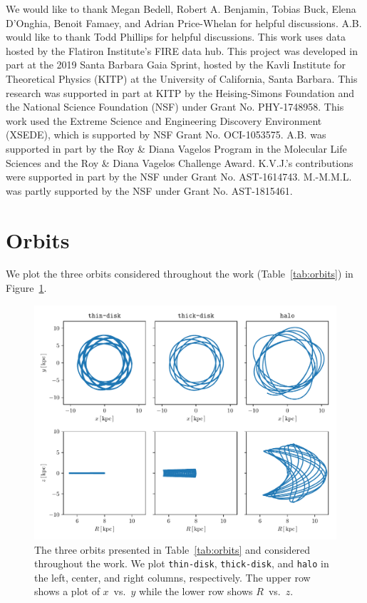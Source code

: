 \documentclass[twocolumn]{aastex62}
\newcommand{\thin}{\texttt{thin-disk}}
\newcommand{\thick}{\texttt{thick-disk}}
\newcommand{\halo}{\texttt{halo}}
\begin{document}
\acknowledgments
We would like to thank Megan Bedell, Robert A. Benjamin, Tobias Buck, Elena
D'Onghia, Benoit Famaey, and Adrian Price-Whelan for helpful discussions. A.B.
would like to thank Todd Phillips for helpful discussions. This work uses data
hosted by the Flatiron Institute's FIRE data hub. This project was developed
in part at the 2019 Santa Barbara Gaia Sprint, hosted by the Kavli Institute
for Theoretical Physics (KITP) at the University of California, Santa Barbara.
This research was supported in part at KITP by the Heising-Simons Foundation
and the National Science Foundation (NSF) under Grant No. PHY-1748958. This
work used the Extreme Science and Engineering Discovery Environment (XSEDE),
which is supported by NSF Grant No. OCI-1053575. A.B. was supported in part by
the Roy \& Diana Vagelos Program in the Molecular Life Sciences and the Roy \&
Diana Vagelos Challenge Award. K.V.J.'s contributions were supported in part
by the NSF under Grant No. AST-1614743. M.-M.M.L. was partly supported by the
NSF under Grant No. AST-1815461.


\appendix
\section{Orbits} \label{app:orbits}
We plot the three orbits considered throughout the work
(Table~\ref{tab:orbits}) in Figure~\ref{fig:plot_orbits}.

\begin{figure}[htb!]
\begin{center}
\includegraphics[width=\textwidth]{fig/orbits.pdf}
\end{center}
\caption{The three orbits presented in Table~\ref{tab:orbits} and considered
throughout the work. We plot \thin{}, \thick{}, and \halo{} in the left,
center, and right columns, respectively. The upper row shows a plot of
$x$~vs.~$y$ while the lower row shows $R$~vs.~$z$.}
\label{fig:plot_orbits}
\end{figure}
\end{document}
